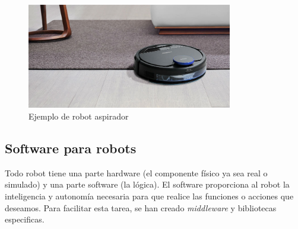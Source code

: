 \begin{figure}[H]
  \begin{center}
    \includegraphics[width=0.8\textwidth]{figures/robotaspiradora.jpg}
		\caption{Ejemplo de robot aspirador}
		\label{fig.drchubo}
		\end{center}
\end{figure}

\subsection{Software para robots}
Todo robot tiene una parte hardware (el componente físico ya sea real o simulado) y una parte software (la lógica). El software proporciona al robot la inteligencia y autonomía necesaria para que realice las funciones o acciones que deseamos. Para facilitar esta tarea, se han creado \textit{middleware} y bibliotecas especificas.

